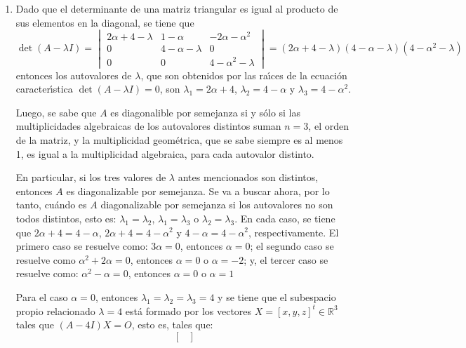 \begin{solucion}
 $\phantom{0}$
 \begin{enumerate}[$a$)]
  \item Dado que el determinante de una matriz triangular es igual al producto de sus elementos en la diagonal, se tiene que 
  \begin{equation*}
   \det (A - \lambda I) = 
   \begin{vmatrix}
    2\alpha+4-\lambda & 1-\alpha & -2\alpha-\alpha^2 \\
    0 & 4 - \alpha - \lambda & 0 \\
    0 & 0 & 4 - \alpha^2 - \lambda 
   \end{vmatrix}
   = (2\alpha+4-\lambda)(4-\alpha-\lambda)(4-\alpha^2-\lambda)
  \end{equation*}
  entonces los autovalores de $\lambda$, que son obtenidos por las ra\'{\i}ces de la ecuaci\'on caracter\'{\i}stica $\det (A - \lambda I) = 0$, son $\lambda_1 = 2\alpha + 4$, $\lambda_2 =  4 - \alpha$ y $\lambda_3 = 4 - \alpha^2$.
  \par 
  Luego, se sabe que $A$ es diagonalible por semejanza si y s\'olo si las multiplicidades algebraicas de los autovalores distintos suman $n=3$, el orden de la matriz, y la multiplicidad geom\'etrica, que se sabe siempre es al menos 1, es igual a la multiplicidad algebraica, para cada autovalor distinto.
  \par 
  En particular, si los tres valores de $\lambda$ antes mencionados son distintos, entonces $A$ es diagonalizable por semejanza. Se va a buscar ahora, por lo tanto, cu\'ando es $A$ diagonalizable por semejanza si los autovalores no son todos distintos, esto es: $\lambda_1 = \lambda_2$, $\lambda_1 = \lambda_3$ o $\lambda_2 = \lambda_3$. En cada caso, se tiene que $2\alpha + 4 = 4-\alpha$, $2\alpha + 4 = 4-\alpha^2$ y $4-\alpha = 4-\alpha^2$, respectivamente. El primero caso se resuelve como: $3\alpha= 0$, entonces $\alpha = 0$; el segundo caso se resuelve como $\alpha^2 + 2\alpha = 0$, entonces $\alpha = 0$ o $\alpha = -2$; y, el tercer caso se resuelve como: $\alpha^2 - \alpha = 0$, entonces $\alpha = 0$ o $\alpha = 1$
  \par 
  Para el caso $\alpha = 0$, entonces $\lambda_1 = \lambda_2 = \lambda_3 = 4$ y se tiene que el subespacio propio relacionado $\lambda=4$ est\'a formado por los vectores $X=[x,y,z]^t\in\mathbb{R}^3$ tales que $(A- 4I)X = O$, esto es, tales que:
  \begin{equation*}
   \begin{bmatrix}

\end{bmatrix}
\end{equation*}
\end{enumerate}
\end{solucion}
